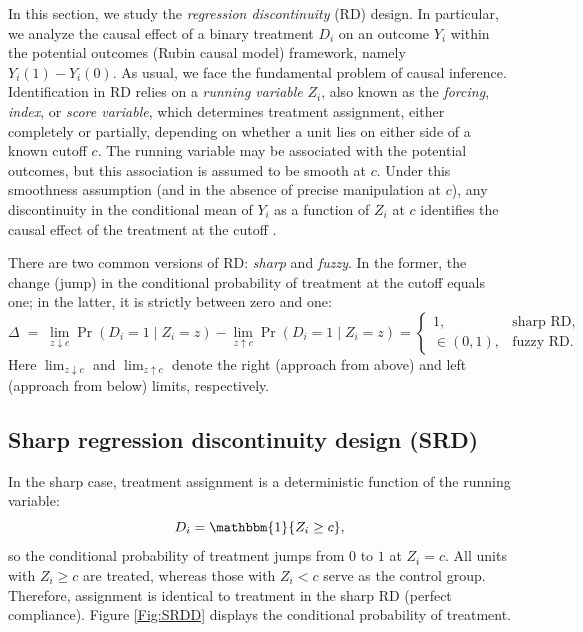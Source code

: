 In this section, we study the \textit{regression discontinuity} (RD) design. In particular, we analyze the causal effect of a binary treatment $D_i$ on an outcome $Y_i$ within the potential outcomes (Rubin causal model) framework, namely $Y_i(1)-Y_i(0)$. As usual, we face the fundamental problem of causal inference. Identification in RD relies on a \textit{running variable} $Z_i$, also known as the \textit{forcing}, \textit{index}, or \textit{score variable}, which determines treatment assignment, either completely or partially, depending on whether a unit lies on either side of a known cutoff $c$. The running variable may be associated with the potential outcomes, but this association is assumed to be smooth at $c$. Under this smoothness assumption (and in the absence of precise manipulation at $c$), any discontinuity in the conditional mean of $Y_i$ as a function of $Z_i$ at $c$ identifies the causal effect of the treatment at the cutoff \cite{imbens2008regression}.

There are two common versions of RD: \emph{sharp} and \emph{fuzzy}. In the former, the change (jump) in the conditional probability of treatment at the cutoff equals one; in the latter, it is strictly between zero and one:
\[
\Delta \;=\; \lim_{z \downarrow c}\Pr(D_i=1\mid Z_i=z)-\lim_{z \uparrow c}\Pr(D_i=1\mid Z_i=z)
=
\begin{cases}
	1, & \text{sharp RD},\\[2pt]
	\in(0,1), & \text{fuzzy RD}.
\end{cases}
\]
Here $\lim_{z \downarrow c}$ and $\lim_{z \uparrow c}$ denote the right (approach from above) and left (approach from below) limits, respectively.

\subsection{Sharp regression discontinuity design (SRD)}

In the sharp case, treatment assignment is a deterministic function of the running variable:
\[
D_i = \mathbbm{1}\{Z_i \ge c\},
\]
so the conditional probability of treatment jumps from $0$ to $1$ at $Z_i=c$. All units with $Z_i \ge c$ are treated, whereas those with $Z_i < c$ serve as the control group. Therefore, assignment is identical to treatment in the sharp RD (perfect compliance). Figure \ref{Fig:SRDD} displays the conditional probability of treatment. 

